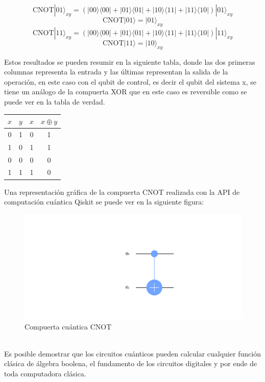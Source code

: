 \documentclass[a4paper]{article}
\begin{document}
\begin{equation}
\text{CNOT}|01\rangle_{xy}=(|00\rangle\langle 00|+|01\rangle\langle 01|+|10\rangle\langle 11|+|11\rangle\langle 10|)|01\rangle_{xy}
\end{equation}
\begin{equation*}
\text{CNOT}|01\rangle=|01\rangle_{xy}
\end{equation*}
\begin{equation}
\text{CNOT}|11\rangle_{xy}=(|00\rangle\langle 00|+|01\rangle\langle 01|+|10\rangle\langle 11|+|11\rangle\langle 10|)|11\rangle_{xy}
\end{equation}
\begin{equation*}
\text{CNOT}|11\rangle=|10\rangle_{xy}
\end{equation*}

Estos resultados se pueden resumir en la siguiente tabla, donde las dos primeras columnas representa la entrada y las últimas representan la salida de la operación, en este caso con el qubit de control, es decir el qubit del sistema x, se tiene un análogo de la compuerta XOR que en este caso es reversible como se puede ver en la tabla de verdad.
\begin{center}
\begin{tabular}{ |c|c|c|c| } 
 \hline
 $x$ & $y$ & $x$ & $x\oplus y$ \\ \hline
 0   & 1   &  0 &    1\\
 1   & 0   &  1 &    1\\
 0   & 0   &  0 &    0\\
 1   & 1   &  1 &    0\\ 
 \hline
\end{tabular}
\end{center}
Una representación gráfica de la compuerta CNOT realizada con la API de computación cuántica Qiskit se puede ver en la siguiente figura:
\begin{figure}[h]
\begin{center}
\includegraphics[scale=0.29]{./basic_CNOT_circuit.png} 
\end{center} 
\caption{Compuerta cuántica CNOT}
\label{fig::NOT_gate}
\end{figure}\\
Es posible demostrar que los circuitos cuánticos pueden calcular cualquier función clásica de álgebra boolena, el fundamento de los circuitos digitales y por ende de toda computadora clásica.
\end{document}

